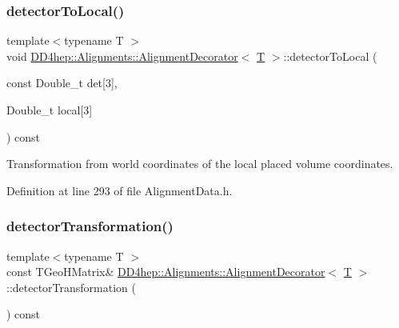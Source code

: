 \subsubsection{\texorpdfstring{detector\+To\+Local()}{detectorToLocal()}\hspace{0.1cm}{\footnotesize\ttfamily [2/2]}}
{\footnotesize\ttfamily template$<$typename T $>$ \\
void \hyperlink{class_d_d4hep_1_1_alignments_1_1_alignment_decorator}{D\+D4hep\+::\+Alignments\+::\+Alignment\+Decorator}$<$ \hyperlink{class_t}{T} $>$\+::detector\+To\+Local (\begin{DoxyParamCaption}\item[{const Double\+\_\+t}]{det\mbox{[}3\mbox{]},  }\item[{Double\+\_\+t}]{local\mbox{[}3\mbox{]} }\end{DoxyParamCaption}) const\hspace{0.3cm}{\ttfamily [inline]}}



Transformation from world coordinates of the local placed volume coordinates. 



Definition at line 293 of file Alignment\+Data.\+h.

\hypertarget{class_d_d4hep_1_1_alignments_1_1_alignment_decorator_aefec287bee71b69ebf1a8e100ee3950c}{}\label{class_d_d4hep_1_1_alignments_1_1_alignment_decorator_aefec287bee71b69ebf1a8e100ee3950c} 
\subsubsection{\texorpdfstring{detector\+Transformation()}{detectorTransformation()}}
{\footnotesize\ttfamily template$<$typename T $>$ \\
const T\+Geo\+H\+Matrix\& \hyperlink{class_d_d4hep_1_1_alignments_1_1_alignment_decorator}{D\+D4hep\+::\+Alignments\+::\+Alignment\+Decorator}$<$ \hyperlink{class_t}{T} $>$\+::detector\+Transformation (\begin{DoxyParamCaption}{ }\end{DoxyParamCaption}) const\hspace{0.3cm}{\ttfamily [inline]}}



